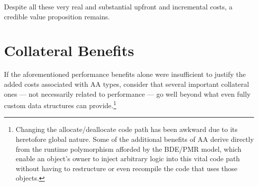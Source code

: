Despite all these very real and substantial upfront and incremental costs, a credible
value proposition remains.

\section{Collateral Benefits}
If the aforementioned performance benefits alone were insufficient to justify the
added costs associated with AA types, consider that several important collateral ones
— not necessarily related to performance — go well beyond what even fully custom
data structures can provide.\footnote{Changing the allocate/deallocate code path has
  been awkward due to its heretofore global nature.
Some of the additional benefits of AA derive directly from the runtime polymorphism afforded by the
BDE/PMR model, which enable an object’s owner to inject arbitrary logic into this  vital code path
without having to restructure or even recompile the code that uses those objects.}

